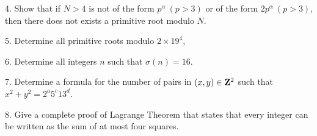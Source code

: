 \item{4.} Show that if $N>4$ is not of the form $p^\alpha\ (p>3)$ or of the form $2p^\alpha\ (p>3)$, then there does not exists a primitive root modulo $N$. \ve\vs

\item{5.} Determine all primitive roots modulo $2\times 19^4$,\vv

\item{6.} Determine all integers $n$ such that $\sigma(n)=16$.\vv

\item{7.} Determine a formula for the number of pairs in $(x,y)\in{\bf Z}^2$ such that $x^2+y^2=2^a5^c13^d$.\ve \vs

\item{8.} Give a complete proof of Lagrange Theorem that states that every integer can be written as the sum of at most four squares.
\ \vst\bye
